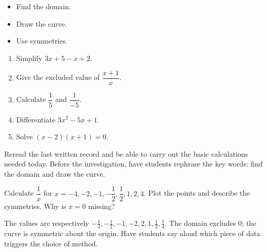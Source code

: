 \begin{objectives}\begin{itemize}\item Find the domain.\item Draw the curve.\item Use symmetries.\end{itemize}\end{objectives}
\begin{fluency}\begin{enumerate}\item Simplify $3x+5-x+2$. \item Give the excluded value of $\dfrac{x+1}{x}$. \item Calculate $\dfrac1{5}$ and $\dfrac1{-5}$. \item Differentiate $3x^2-5x+1$. \item Solve $(x-2)(x+1)=0$. \end{enumerate}\end{fluency}
\begin{prerequisites}Reread the last written record and be able to carry out the basic calculations needed today. Before the investigation, have students rephrase the key words: find the domain and draw the curve.\end{prerequisites}

\begin{activity}
Calculate $\dfrac1x$ for $x=-4,-2,-1,-\dfrac12,\dfrac12,1,2,4$. Plot the points and describe the symmetries. Why is $x=0$ missing?
\begin{center}\end{center}
\end{activity}
\begin{solution}The values are respectively $-\frac14,-\frac12,-1,-2,2,1,\frac12,\frac14$. The domain excludes $0$; the curve is symmetric about the origin. Have students say aloud which piece of data triggers the choice of method.\end{solution}

